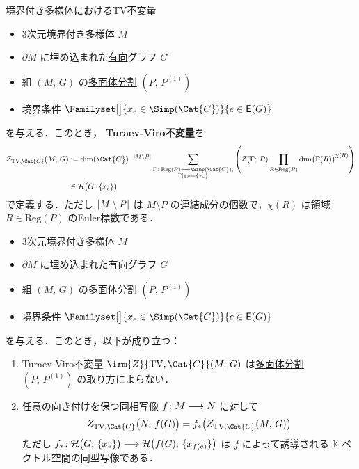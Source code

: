 \documentclass[TQFT_main]{subfiles}
\begin{document}
\begin{mydef}[label=def:TV-bdy]{境界付き多様体におけるTV不変量}
    \begin{itemize}
        \item 3次元境界付き多様体 $M$
        \item $\partial M$ に埋め込まれた\underline{有向}グラフ $G$
        \item 組 $(M,\, G)$ の\hyperref[def:polytope-decomp]{多面体分割} $(P,\, P^{(1)})$ 
        \item 境界条件 $\Familyset[\big]{x_e \in \Simp(\Cat{C})}{e \in \mathsf{E}(G)}$
    \end{itemize}
    を与える．このとき，
    \textbf{Turaev-Viro不変量}を
    \begin{align}
        Z_{\text{TV},\Cat{C}}(M,\, G) 
        &\coloneqq \dim(\Cat{C})^{-\abs{M\setminus P}} \sum_{\substack{\Gamma \colon \mathrm{Reg}(P) \lto \Simp(\Cat{C}), \\ \Gamma|_{\partial P} = \{x_e\}}} \left(Z(\Gamma;\, P) \prod_{R \in \mathrm{Reg}(P)} \dim \bigl( \Gamma(R) \bigr)^{\chi(R)}\right) \\
        &\in \mathcal{H} \bigl( G;\, \{x_e\} \bigr) 
    \end{align}
    で定義する．ただし $\abs{M\setminus P}$ は $M \setminus P$ の連結成分の個数で，$\chi (R)$ は\hyperref[def:polyhedron]{領域} $R \in \mathrm{Reg}(P)$ のEuler標数である．
\end{mydef}

\begin{mytheo}[label=thm:TV-bdy]{}
    \begin{itemize}
        \item 3次元境界付き多様体 $M$
        \item $\partial M$ に埋め込まれた\underline{有向}グラフ $G$
        \item 組 $(M,\, G)$ の\hyperref[def:polytope-decomp]{多面体分割} $(P,\, P^{(1)})$ 
        \item 境界条件 $\Familyset[\big]{x_e \in \Simp(\Cat{C})}{e \in \mathsf{E}(G)}$
    \end{itemize}
    を与える．このとき，以下が成り立つ：
    \begin{enumerate}
        \item Turaev-Viro不変量 $\irm{Z}{\text{TV},\Cat{C}}(M,\, G)$ は\hyperref[def:polytope-decomp]{多面体分割} $(P,\, P^{(1)})$ の取り方によらない．
        \item 任意の向き付けを保つ同相写像 $f \colon M \longrightarrow N$ に対して
        \begin{align}
            Z_{\text{TV},\Cat{C}}\bigl(N,\, f(G)\bigr) = f_* \bigl( Z_{\text{TV},\Cat{C}}(M,\, G) \bigr) 
        \end{align}
        ただし $f_* \colon \mathcal{H} \bigl(G;\, \{x_e\}\bigr) \longrightarrow \mathcal{H} \bigl( f(G);\, \{x_{f(e)}\} \bigr)$ は $f$ によって誘導される $\mathbb{K}$-ベクトル空間の同型写像である．
    \end{enumerate}
\end{mytheo}
\end{document}
